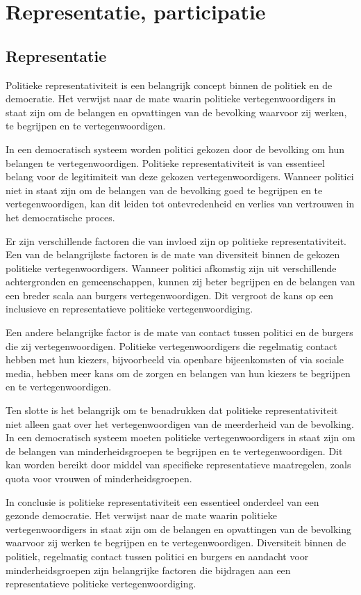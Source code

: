 \chapter{Representatie, participatie}

\section{Representatie}
Politieke representativiteit is een belangrijk concept binnen de politiek en de democratie. Het verwijst naar de mate waarin politieke vertegenwoordigers in staat zijn om de belangen en opvattingen van de bevolking waarvoor zij werken, te begrijpen en te vertegenwoordigen.

In een democratisch systeem worden politici gekozen door de bevolking om hun belangen te vertegenwoordigen. Politieke representativiteit is van essentieel belang voor de legitimiteit van deze gekozen vertegenwoordigers. Wanneer politici niet in staat zijn om de belangen van de bevolking goed te begrijpen en te vertegenwoordigen, kan dit leiden tot ontevredenheid en verlies van vertrouwen in het democratische proces.

Er zijn verschillende factoren die van invloed zijn op politieke representativiteit. Een van de belangrijkste factoren is de mate van diversiteit binnen de gekozen politieke vertegenwoordigers. Wanneer politici afkomstig zijn uit verschillende achtergronden en gemeenschappen, kunnen zij beter begrijpen en de belangen van een breder scala aan burgers vertegenwoordigen. Dit vergroot de kans op een inclusieve en representatieve politieke vertegenwoordiging.

Een andere belangrijke factor is de mate van contact tussen politici en de burgers die zij vertegenwoordigen. Politieke vertegenwoordigers die regelmatig contact hebben met hun kiezers, bijvoorbeeld via openbare bijeenkomsten of via sociale media, hebben meer kans om de zorgen en belangen van hun kiezers te begrijpen en te vertegenwoordigen.

Ten slotte is het belangrijk om te benadrukken dat politieke representativiteit niet alleen gaat over het vertegenwoordigen van de meerderheid van de bevolking. In een democratisch systeem moeten politieke vertegenwoordigers in staat zijn om de belangen van minderheidsgroepen te begrijpen en te vertegenwoordigen. Dit kan worden bereikt door middel van specifieke representatieve maatregelen, zoals quota voor vrouwen of minderheidsgroepen.

In conclusie is politieke representativiteit een essentieel onderdeel van een gezonde democratie. Het verwijst naar de mate waarin politieke vertegenwoordigers in staat zijn om de belangen en opvattingen van de bevolking waarvoor zij werken te begrijpen en te vertegenwoordigen. Diversiteit binnen de politiek, regelmatig contact tussen politici en burgers en aandacht voor minderheidsgroepen zijn belangrijke factoren die bijdragen aan een representatieve politieke vertegenwoordiging.

